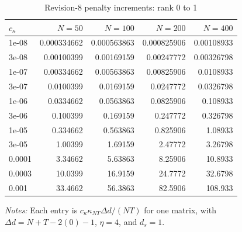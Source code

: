 \begin{table}[!htbp]
\centering
\caption{Revision-8 penalty increments: rank 0 to 1}
\label{tab:ic-penalty-r0}
\begin{tabular}{lrrrr}
\toprule
$c_\kappa$ & $N=50$ & $N=100$ & $N=200$ & $N=400$ \\
\midrule
1e-08 & 0.000334662 & 0.000563863 & 0.000825906 & 0.00108933 \\
3e-08 & 0.00100399 & 0.00169159 & 0.00247772 & 0.00326798 \\
1e-07 & 0.00334662 & 0.00563863 & 0.00825906 & 0.0108933 \\
3e-07 & 0.0100399 & 0.0169159 & 0.0247772 & 0.0326798 \\
1e-06 & 0.0334662 & 0.0563863 & 0.0825906 & 0.108933 \\
3e-06 & 0.100399 & 0.169159 & 0.247772 & 0.326798 \\
1e-05 & 0.334662 & 0.563863 & 0.825906 & 1.08933 \\
3e-05 & 1.00399 & 1.69159 & 2.47772 & 3.26798 \\
0.0001 & 3.34662 & 5.63863 & 8.25906 & 10.8933 \\
0.0003 & 10.0399 & 16.9159 & 24.7772 & 32.6798 \\
0.001 & 33.4662 & 56.3863 & 82.5906 & 108.933 \\
\bottomrule
\end{tabular}
\begin{minipage}{0.96\linewidth}\footnotesize \textit{Notes:} Each entry is $c_\kappa\kappa_{NT}\Delta d/(NT)$ for one matrix, with $\Delta d=N+T-2(0)-1$, $\eta=4$, and $d_s=1$.\end{minipage}
\end{table}

